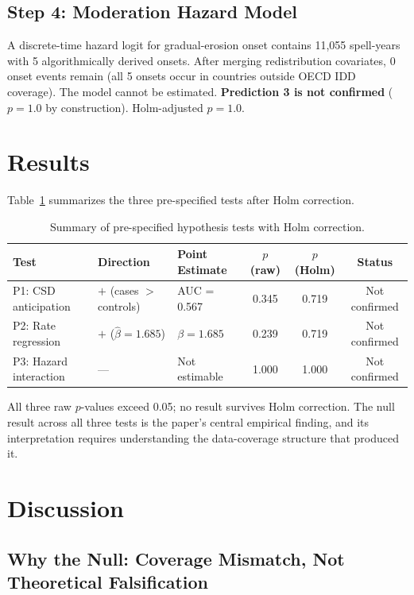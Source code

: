 \documentclass[11pt,letterpaper]{article}
\begin{document}
\subsection{Step 4: Moderation Hazard Model}

A discrete-time hazard logit for gradual-erosion onset contains 11,055 spell-years with 5 algorithmically derived
onsets. After merging redistribution covariates, 0 onset events remain (all 5 onsets occur in countries outside OECD
IDD coverage). The model cannot be estimated. \textbf{Prediction 3 is not confirmed} ($p = 1.0$ by construction).
Holm-adjusted $p = 1.0$.

\section{Results}
\label{sec:results}

Table~\ref{tab:results} summarizes the three pre-specified tests after Holm correction.

\begin{table}[!htbp]
  \centering
  \caption{Summary of pre-specified hypothesis tests with Holm correction.}
  \label{tab:results}
  \begin{tabular}{@{}lllccc@{}}
    \toprule
    Test & Direction & Point Estimate & $p$ (raw) & $p$ (Holm) & Status \\
    \midrule
    P1: CSD anticipation & $+$ (cases $>$ controls) & AUC = 0.567 & 0.345 & 0.719 & Not confirmed \\
    P2: Rate regression & $+$ ($\hat{\beta} = 1.685$) & $\beta = 1.685$ & 0.239 & 0.719 & Not confirmed \\
    P3: Hazard interaction & --- & Not estimable & 1.000 & 1.000 & Not confirmed \\
    \bottomrule
  \end{tabular}
\end{table}

All three raw $p$-values exceed 0.05; no result survives Holm correction. The null result across all three tests is the
paper's central empirical finding, and its interpretation requires understanding the data-coverage structure that
produced it.

\section{Discussion}
\label{sec:discussion}

\subsection{Why the Null: Coverage Mismatch, Not Theoretical Falsification}
\end{document}
